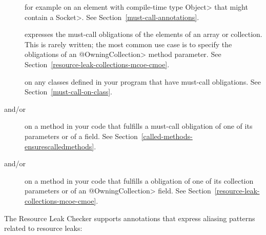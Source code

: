 \begin{description}

\item[]
for example on an element with compile-time type \<Object> that might contain a \<Socket>.
See Section~\ref{must-call-annotations}.

\item[]
expresses the must-call obligations of the elements of an array or
collection. This is rarely written; the most common use case is to specify the
obligations of an \<@OwningCollection> method parameter. See
Section~\ref{resource-leak-collections-mcoe-cmoe}.

\item[]
on any classes defined in your program that have must-call obligations. See Section~\ref{must-call-on-class}.

\item[ and/or
      ]
on a method in your code that fulfills a must-call obligation of one of its parameters or of a field.
See Section~\ref{called-methods-ensurescalledmethods}.

\item[ and/or
      ]
on a method in your code that fulfills a \MustCallOnElements obligation of
one of its collection parameters or of an \<@OwningCollection> field. See
Section~\ref{resource-leak-collections-mcoe-cmoe}.

\end{description}

The Resource Leak Checker supports annotations that express
aliasing patterns related to resource leaks:

